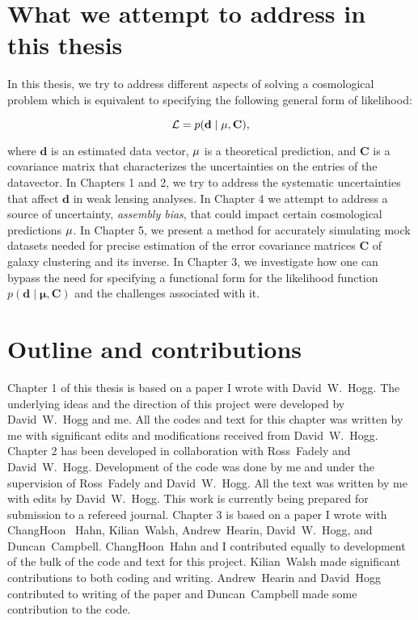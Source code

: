 \section{What we attempt to address in this thesis}

In this thesis, we try to address different aspects of solving a cosmological problem which is equivalent to specifying the following general form of likelihood:

\begin{equation}
\mathcal{L} = p(\mathbf{d} \; | \; \bf{\mu} , \mathbf{C}),
\end{equation}

where $\mathbf{d}$ is an estimated data vector, $\bf{\mu}$ is a theoretical prediction, and $\mathbf{C}$ is a covariance matrix that characterizes the uncertainties on the entries of the datavector. In Chapters 1 and 2, we try to address the systematic uncertainties that affect $\mathbf{d}$ in weak lensing analyses. In Chapter 4 we attempt to address a source of uncertainty, \emph{assembly bias}, that could impact certain cosmological predictions $\bf{\mu}$. In Chapter 5, we present a method for accurately simulating mock datasets needed for precise estimation of the error covariance matrices $\mathbf{C}$ of galaxy clustering and its inverse. In Chapter 3, we investigate how one can bypass the need for specifying a functional form for the likelihood function $p(\mathbf{d} \; | \; \mathbf{\mu} , \mathbf{C})$ and the challenges associated with it.

\section{Outline and contributions}

Chapter 1 of this thesis is based on a paper I wrote with David~W.~Hogg. The underlying ideas and the direction of this project were developed by David~W.~Hogg and me. 
All the codes and text for this chapter was written by me with significant edits and modifications received from David~W.~Hogg. Chapter 2 has been developed in collaboration with Ross~Fadely and David~W.~Hogg. Development of the code was done by me and under the supervision of Ross~Fadely and David~W.~Hogg. All the text was written by me with edits by David~W.~Hogg. This work is currently being prepared for submission to a refereed journal.
Chapter 3 is based on a paper I wrote with ChangHoon~ Hahn, Kilian~Walsh, Andrew~Hearin, David~W.~Hogg, and Duncan~Campbell. ChangHoon~Hahn and I contributed equally to development of the bulk of the code and text for this project. Kilian~Walsh made significant contributions to both coding and writing. Andrew~Hearin and David~Hogg contributed to writing of the paper and Duncan~Campbell made some contribution 
to the code. 

